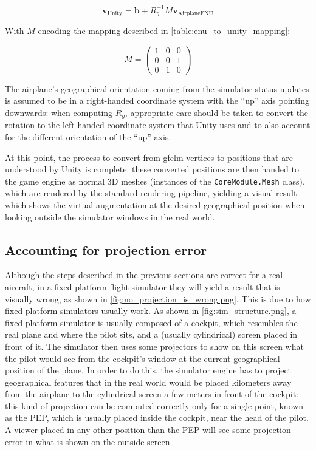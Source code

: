 \begin{equation}
    \mathbf{v}_{\text{Unity}} = \mathbf{b} + R_g^{-1} M\mathbf{v}_{\text{AirplaneENU}}
\end{equation}

With $M$ encoding the mapping described in \autoref{table:enu_to_unity_mapping}:

\begin{equation}
    M = \begin{pmatrix} 1 & 0 & 0 \\ 0 & 0 & 1 \\ 0 & 1 & 0\end{pmatrix}
\end{equation}

The airplane's geographical orientation coming from the simulator status updates is assumed to be in a right-handed coordinate system with the \enquote{up} axis pointing downwards: when computing $R_g$, appropriate care should be taken to convert the rotation to the left-handed coordinate system that Unity uses and to also account for the different orientation of the \enquote{up} axis.

At this point, the process to convert from \gls{gfelm} vertices to positions that are understood by Unity is complete: these converted positions are then handed to the game engine as normal 3D meshes (instances of the \texttt{CoreModule.Mesh} class), which are rendered by the standard rendering pipeline, yielding a visual result which shows the virtual augmentation at the desired geographical position when looking outside the simulator windows in the real world.

\subsection{Accounting for projection error}\label{sec:projection_error}

Although the steps described in the previous sections are correct for a real aircraft, in a fixed-platform flight simulator they will yield a result that is visually wrong, as shown in \autoref{fig:no_projection_is_wrong.png}. This is due to how fixed-platform simulators usually work. As shown in \autoref{fig:sim_structure.png}, a fixed-platform simulator is usually composed of a cockpit, which resembles the real plane and where the pilot sits, and a (usually cylindrical) screen placed in front of it. The simulator then uses some projectors to show on this screen what the pilot would see from the cockpit's window at the current geographical position of the plane. In order to do this, the simulator engine has to project geographical features that in the real world would be placed kilometers away from the airplane to the cylindrical screen a few meters in front of the cockpit: this kind of projection can be computed correctly only for a single point, known as the \gls{PEP}, which is usually placed inside the cockpit, near the head of the pilot. A viewer placed in any other position than the \gls{PEP} will see some projection error in what is shown on the outside screen.

